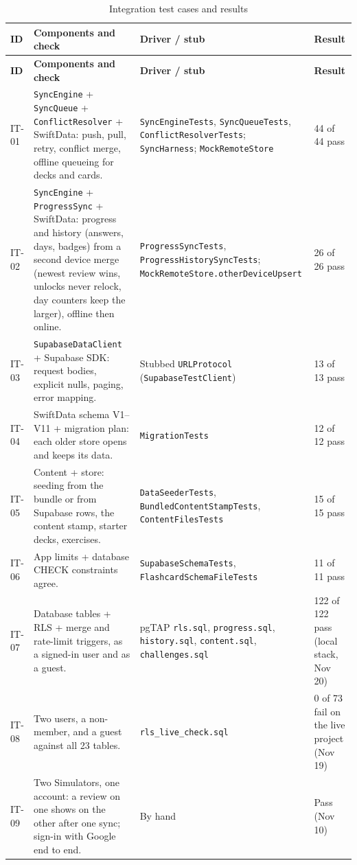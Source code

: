 \documentclass[12pt,letterpaper]{article}
\begin{document}
\begin{xltabular}{\textwidth}{@{}L{1.1cm} Y L{3.4cm} L{2.2cm}@{}}
\caption{Integration test cases and results}\label{tab:inttests}\\
\toprule
\textbf{ID} & \textbf{Components and check} & \textbf{Driver / stub} & \textbf{Result} \\
\midrule
\endfirsthead
\toprule
\textbf{ID} & \textbf{Components and check} & \textbf{Driver / stub} & \textbf{Result} \\
\midrule
\endhead
\bottomrule
\endfoot
IT-01 & \texttt{SyncEngine} + \texttt{SyncQueue} + \texttt{ConflictResolver} + SwiftData: push, pull, retry, conflict merge, offline queueing for decks and cards. & \texttt{SyncEngineTests}, \texttt{SyncQueueTests}, \texttt{ConflictResolverTests}; \texttt{SyncHarness}; \texttt{MockRemoteStore} & 44 of 44 pass \\
IT-02 & \texttt{SyncEngine} + \texttt{ProgressSync} + SwiftData: progress and history (answers, days, badges) from a second device merge (newest review wins, unlocks never relock, day counters keep the larger), offline then online. & \texttt{ProgressSyncTests}, \texttt{ProgressHistorySyncTests}; \texttt{MockRemoteStore.otherDeviceUpsert} & 26 of 26 pass \\
IT-03 & \texttt{SupabaseDataClient} + Supabase SDK: request bodies, explicit nulls, paging, error mapping. & Stubbed \texttt{URLProtocol} (\texttt{SupabaseTestClient}) & 13 of 13 pass \\
IT-04 & SwiftData schema V1--V11 + migration plan: each older store opens and keeps its data. & \texttt{MigrationTests} & 12 of 12 pass \\
IT-05 & Content + store: seeding from the bundle or from Supabase rows, the content stamp, starter decks, exercises. & \texttt{DataSeederTests}, \texttt{BundledContentStampTests}, \texttt{ContentFilesTests} & 15 of 15 pass \\
IT-06 & App limits + database CHECK constraints agree. & \texttt{SupabaseSchemaTests}, \texttt{FlashcardSchemaFileTests} & 11 of 11 pass \\
IT-07 & Database tables + RLS + merge and rate-limit triggers, as a signed-in user and as a guest. & pgTAP \texttt{rls.sql}, \texttt{progress.sql}, \texttt{history.sql}, \texttt{content.sql}, \texttt{challenges.sql} & 122 of 122 pass (local stack, Nov 20) \\
IT-08 & Two users, a non-member, and a guest against all 23 tables. & \texttt{rls\_live\_check.sql} & 0 of 73 fail on the live project (Nov 19) \\
IT-09 & Two Simulators, one account: a review on one shows on the other after one sync; sign-in with Google end to end. & By hand & Pass (Nov 10) \\
\end{xltabular}
\end{document}
